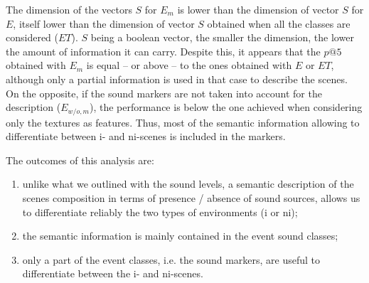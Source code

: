 \documentclass[12pt]{elsarticle}
\newcommand{\ie}{\emph{i.\,e.}}
\begin{document}
The dimension of the vectors $S$ for $E_m$ is lower than the dimension of vector $S$ for $E$, itself lower than the dimension of vector $S$ obtained when all the classes are considered ($ET$). $S$ being a boolean vector, the smaller the dimension, the lower the amount of information it can carry. Despite this, it appears that the $p@5$ obtained with $E_m$ is equal – or above – to the ones obtained with $E$ or $ET$, although only a partial information is used in that case to describe the scenes. On the opposite, if the sound markers are not taken into account for the description ($E_{w/o,m}$), the performance is below the one achieved when considering only the textures as features. Thus, most of the semantic information allowing to differentiate between i- and ni-scenes is included in the markers.

%

The outcomes of this analysis are:

\begin{enumerate}
\item unlike what we outlined with the sound levels, a semantic description of the scenes composition in terms of presence / absence of sound sources, allows us to differentiate reliably the two types of environments (i or ni);
\item the semantic information is mainly contained in the event sound classes;
\item only a part of the event classes, i.e. the sound markers, are useful to differentiate between the i- and ni-scenes.
\end{enumerate}

\end{document}
